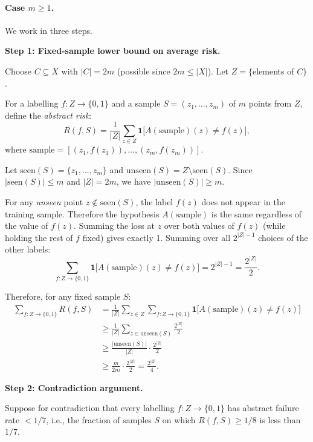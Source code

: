 \documentclass[11pt]{article}
\theoremstyle{remark}
\newcommand{\Bool}{\{0,1\}}
\newcommand{\card}[1]{|#1|}
\begin{document}
\paragraph{Case $m \ge 1$.}
We work in three steps.

\medskip
\noindent\textbf{Step 1: Fixed-sample lower bound on average risk.}

Choose $C \subseteq X$ with $\card{C} = 2m$ (possible since $2m \le
\card{X}$).  Let $Z = \{$elements of $C\}$.

For a labelling $f : Z \to \Bool$ and a sample $S = (z_1, \ldots, z_m)$
of $m$ points from $Z$, define the \emph{abstract risk}:
\[
  R(f, S) = \frac{1}{\card{Z}} \sum_{z \in Z}
    \mathbf{1}\!\bigl[A(\text{sample})(z) \ne f(z)\bigr],
\]
where $\text{sample} = [(z_1, f(z_1)), \ldots, (z_m, f(z_m))]$.

Let $\mathrm{seen}(S) = \{z_1, \ldots, z_m\}$ and
$\mathrm{unseen}(S) = Z \setminus \mathrm{seen}(S)$.  Since
$\card{\mathrm{seen}(S)} \le m$ and $\card{Z} = 2m$, we have
$\card{\mathrm{unseen}(S)} \ge m$.

For any \emph{unseen} point $z \notin \mathrm{seen}(S)$, the label
$f(z)$ does not appear in the training sample.  Therefore the hypothesis
$A(\text{sample})$ is the same regardless of the value of $f(z)$.
Summing the loss at $z$ over both values of $f(z)$ (while holding the
rest of $f$ fixed) gives exactly 1.  Summing over all $2^{\card{Z}-1}$
choices of the other labels:
\[
  \sum_{f : Z \to \Bool} \mathbf{1}\!\bigl[A(\text{sample})(z) \ne f(z)\bigr]
  = 2^{\card{Z}-1} = \frac{2^{\card{Z}}}{2}.
\]

Therefore, for any fixed sample $S$:
\begin{align*}
  \sum_{f : Z \to \Bool} R(f, S)
  &= \frac{1}{\card{Z}} \sum_{z \in Z}
       \sum_{f : Z \to \Bool}
         \mathbf{1}\!\bigl[A(\text{sample})(z) \ne f(z)\bigr]
  \\
  &\ge \frac{1}{\card{Z}} \sum_{z \in \mathrm{unseen}(S)}
       \frac{2^{\card{Z}}}{2}
  \\
  &\ge \frac{\card{\mathrm{unseen}(S)}}{\card{Z}} \cdot \frac{2^{\card{Z}}}{2}
  \\
  &\ge \frac{m}{2m} \cdot \frac{2^{\card{Z}}}{2}
  = \frac{2^{\card{Z}}}{4}.
\end{align*}

\medskip
\noindent\textbf{Step 2: Contradiction argument.}

Suppose for contradiction that every labelling $f : Z \to \Bool$ has
abstract failure rate $< 1/7$, i.e., the fraction of samples $S$ on
which $R(f, S) \ge 1/8$ is less than $1/7$.
\end{document}
